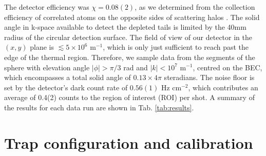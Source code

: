 	The detector efficiency was $\chi=0.08(2)$, as we determined from the collection efficiency of correlated atoms on the opposite sides of scattering halos \cite{shin19,shin20,Jaskula10}. The solid angle in k-space available to detect the depleted tails is limited by the 40mm radius of the circular detection surface. The field of view of our detector in the $(x,y)$ plane is $\lesssim5\times 10^6$ m$^{-1}$, which is only just sufficient to reach past the edge of the thermal region. Therefore, we sample data from the segments of the sphere with elevation angle $|\phi|>\pi/3$ rad and $|k|<10^7$ m$^{-1}$, centred on the BEC, which encompasses a total solid angle of $0.13\times 4\pi$ steradians. The noise floor is set by the detector's dark count rate of $0.56(1)$ Hz cm$^{-2}$, which contributes an average of 0.4(2) counts to the region of interest (ROI) per shot.  A summary of the results for each data run are shown in Tab. \ref{tab:results}.








\section{Trap configuration and calibration}

